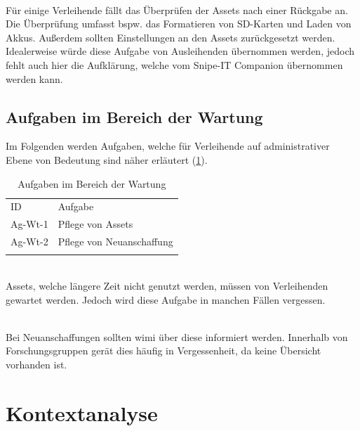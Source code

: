 {\sffamily\color{maincolor}{Ag-Rg-2 | Überprüfung der Assets}}\\
Für einige Verleihende fällt das Überprüfen der Assets nach einer Rückgabe an. Die
Überprüfung umfasst bspw. das Formatieren von SD-Karten und Laden von Akkus. Außerdem sollten
Einstellungen an den Assets zurückgesetzt werden. Idealerweise würde diese Aufgabe von Ausleihenden
übernommen werden, jedoch fehlt auch hier die Aufklärung, welche vom Snipe-IT Companion übernommen
werden kann.
\subsection{Aufgaben im Bereich der Wartung}
\label{subsec:wartung}
Im Folgenden werden Aufgaben, welche für Verleihende auf administrativer Ebene von Bedeutung sind
näher erläutert (\ref{table:Ag-Wt}).

\begin{table}[h]
        \centering
        \caption{Aufgaben im Bereich der Wartung}
        \begin{tabular}{ll}
                \arrayrulecolor{maincolor}\hline
                \sffamily\color{maincolor}ID & \sffamily\color{maincolor}Aufgabe \\
                \arrayrulecolor{maincolor}\hline
                Ag-Wt-1                      & Pflege von Assets                 \\
                Ag-Wt-2                      & Pflege von Neuanschaffung         \\
                \arrayrulecolor{maincolor}\hline
        \end{tabular}
        \label{table:Ag-Wt}
\end{table}

{\sffamily\color{maincolor}{Ag-Wt-1 | Pflege von Assets}}\\
Assets, welche längere Zeit nicht genutzt werden, müssen von Verleihenden gewartet werden. Jedoch
wird diese Aufgabe in manchen Fällen vergessen.

        {\sffamily\color{maincolor}{Ag-Wt-2 | Pflege von Assets}} \\
Bei Neuanschaffungen sollten \ac{wimi} über diese informiert werden. Innerhalb von
Forschungsgruppen gerät dies häufig in Vergessenheit, da keine Übersicht vorhanden ist.


\section{Kontextanalyse}
\label{section:kontext}

